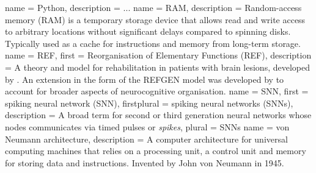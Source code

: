  {
  name = Python,
  description = {...}
}
 {
  name = RAM,
  description = {Random-access memory (RAM) is a temporary storage device
	         that allows read and write access to arbitrary locations
		 without significant delays compared to spinning disks.
		 Typically used as a cache for instructions and memory
		 from long-term storage.}
}
 {
  name = REF,
  first = {Reorganisation of Elementary Functions (REF)},
  description = {A theory and model for rehabilitation in patients
  with brain lesions, developed by \cite{Mogensen2011}.
  An extension in the form of the REFGEN model was developed by
  \textcite{Mogensen2017} to account for broader aspects of
  neurocognitive organisation.}
}
 {
  name = SNN,
  first = {spiking neural network (SNN)},
  firstplural = {spiking neural networks (SNNs)},
  description = {A broad term for second or third generation neural
                 networks whose nodes communicates via timed pulses or
		 \textit{spikes}},
  plural = {SNNs}
}
 {
  name = {von Neumann architecture},
  description = {A computer architecture for universal computing machines that
                 relies on a processing unit, a control unit and memory for
		 storing data and instructions. Invented by John von Neumann in
		 1945.}
}
